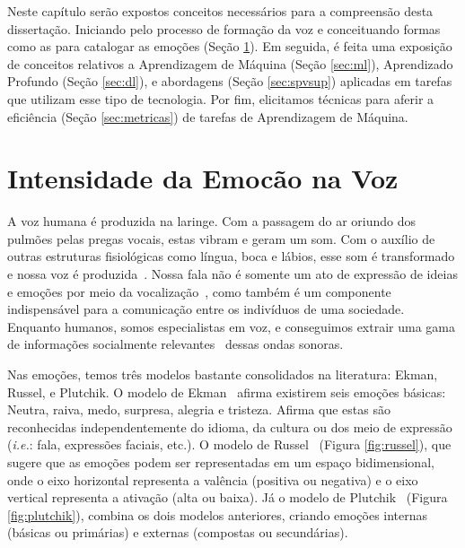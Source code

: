 \label{Cap:Fundamentação Teórica}

Neste capítulo serão expostos conceitos necessários para a compreensão desta dissertação. Iniciando pelo processo de formação da voz e conceituando formas como as para catalogar as emoções (Seção \ref{sec:vozemoint}). Em seguida, é feita uma exposição de conceitos relativos a Aprendizagem de Máquina (Seção \ref{sec:ml}), Aprendizado Profundo (Seção \ref{sec:dl}), e abordagens (Seção \ref{sec:spvsup}) aplicadas em tarefas que utilizam esse tipo de tecnologia. Por fim, elicitamos técnicas para aferir a eficiência (Seção \ref{sec:metricas}) de tarefas de Aprendizagem de Máquina.\\

\section{Intensidade da Emocão na Voz}\label{sec:vozemoint}

A voz humana é produzida na laringe. Com a passagem do ar oriundo dos pulmões pelas pregas vocais, estas vibram e geram um som. Com o auxílio de outras estruturas fisiológicas como língua, boca e lábios, esse som é transformado e nossa voz é produzida~\cite{51}. Nossa fala não é somente um ato de expressão de ideias e emoções por meio da vocalização~\cite{6.31}, como também é um componente indispensável para a comunicação entre os indivíduos de uma sociedade. Enquanto humanos, somos especialistas em voz, e conseguimos extrair uma gama de informações socialmente relevantes~\cite{49} dessas ondas sonoras.

Nas emoções, temos três modelos bastante consolidados na literatura: Ekman, Russel, e Plutchik. O modelo de Ekman~\cite{31.9} afirma existirem seis emoções básicas: Neutra, raiva, medo, surpresa, alegria e tristeza. Afirma que estas são reconhecidas independentemente do idioma, da cultura ou dos meio de expressão (\textit{i.e.}: fala, expressões faciais, etc.). O modelo de Russel~\cite{31.10} (Figura \ref{fig:russel}), que sugere que as emoções podem ser representadas em um espaço bidimensional, onde o eixo horizontal representa a valência (positiva ou negativa) e o eixo vertical representa a ativação (alta ou baixa). Já o modelo de Plutchik~\cite{57} (Figura \ref{fig:plutchik}), combina os dois modelos anteriores, criando emoções internas (básicas ou primárias) e externas (compostas ou secundárias).

